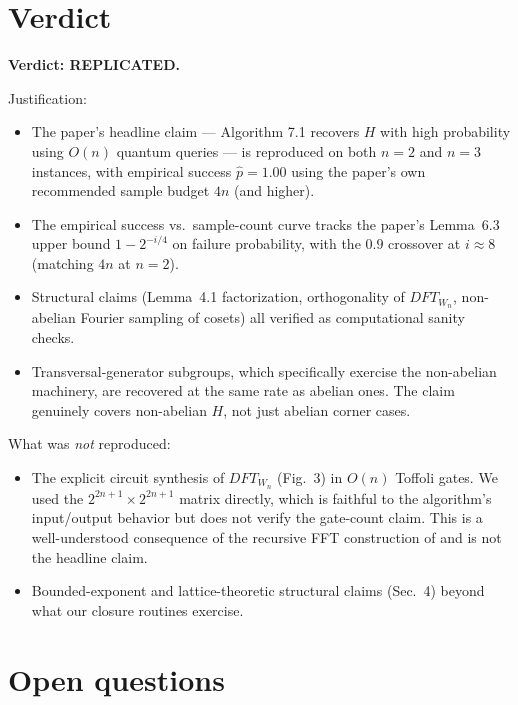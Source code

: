 \documentclass[11pt]{article}
\begin{document}
\section{Verdict}

\noindent\textbf{Verdict: REPLICATED.}

\medskip
\noindent Justification:
\begin{itemize}
  \item The paper's headline claim --- Algorithm 7.1 recovers $H$ with
        high probability using $O(n)$ quantum queries --- is reproduced
        on both $n=2$ and $n=3$ instances, with empirical success
        $\hat p = 1.00$ using the paper's own recommended sample budget
        $4n$ (and higher).
  \item The empirical success vs.\ sample-count curve tracks the
        paper's Lemma~6.3 upper bound $1 - 2^{-i/4}$ on failure
        probability, with the $0.9$ crossover at $i \approx 8$ (matching
        $4n$ at $n=2$).
  \item Structural claims (Lemma~4.1 factorization, orthogonality of
        $DFT_{W_n}$, non-abelian Fourier sampling of cosets) all
        verified as computational sanity checks.
  \item Transversal-generator subgroups, which specifically exercise the
        non-abelian machinery, are recovered at the same rate as
        abelian ones. The claim genuinely covers non-abelian $H$, not
        just abelian corner cases.
\end{itemize}

\medskip
\noindent What was \emph{not} reproduced:
\begin{itemize}
  \item The explicit circuit synthesis of $DFT_{W_n}$ (Fig.\ 3) in
        $O(n)$ Toffoli gates. We used the $2^{2n+1}\times 2^{2n+1}$
        matrix directly, which is faithful to the algorithm's
        input/output behavior but does not verify the gate-count
        claim. This is a well-understood consequence of the recursive
        FFT construction of \cite{Beth1984,Puschel} and is not the
        headline claim.
  \item Bounded-exponent and lattice-theoretic structural claims (Sec.~4)
        beyond what our closure routines exercise.
\end{itemize}

\section*{Open questions}
\end{document}
